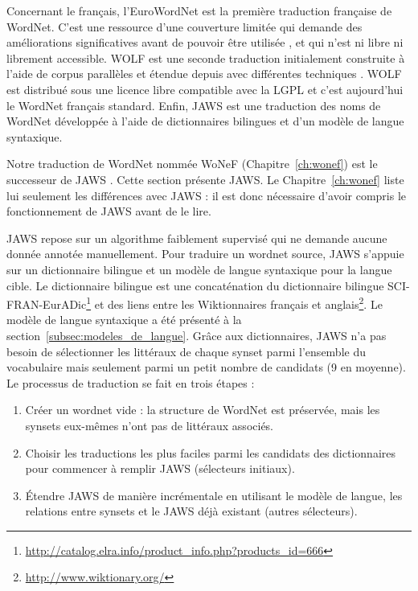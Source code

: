 Concernant le français, l'EuroWordNet \citep{vossen1998eurowordnet} est la
première traduction française de WordNet. C'est une ressource d'une couverture
limitée qui demande des améliorations significatives avant de pouvoir être
utilisée \citep{jacquin2006systemes}, et qui n'est ni libre ni librement
accessible. WOLF est une seconde traduction initialement construite à l'aide de
corpus parallèles \citep{sagot2008construction} et étendue depuis avec
différentes techniques \citep{apidianaki2012applying}. WOLF est distribué sous
une licence libre compatible avec la LGPL et c'est aujourd'hui le WordNet
français standard. Enfin, JAWS \citep{mouton2010jaws} est une traduction des
noms de WordNet développée à l'aide de dictionnaires bilingues et d'un modèle
de langue syntaxique.

\label{subsec:jaws_translation_process}

Notre traduction de WordNet nommée WoNeF (Chapitre~\ref{ch:wonef}) est le
successeur de JAWS \citep{mouton2010jaws,mouton2010phd}. Cette section présente
JAWS. Le Chapitre~\ref{ch:wonef} liste lui seulement les différences avec JAWS
: il est donc nécessaire d'avoir compris le fonctionnement de JAWS avant de le
lire.

JAWS repose sur un algorithme faiblement supervisé qui ne demande aucune donnée
annotée manuellement. Pour traduire un wordnet source, JAWS s'appuie sur un
dictionnaire bilingue et un modèle de langue syntaxique pour la langue cible.
Le dictionnaire bilingue est une concaténation du dictionnaire bilingue
SCI-FRAN-EurADic\footnote{\url{http://catalog.elra.info/product_info.php?products_id=666}}
et des liens entre les Wiktionnaires français et
anglais\footnote{\url{http://www.wiktionary.org/}}. Le modèle de langue
syntaxique a été présenté à la section~\ref{subsec:modeles_de_langue}. Grâce
aux dictionnaires, JAWS n'a pas besoin de sélectionner les littéraux de chaque
synset parmi l'ensemble du vocabulaire mais seulement parmi un petit nombre de
candidats (9 en moyenne).  Le processus de traduction se fait en trois étapes :

\begin{enumerate}
    \item Créer un wordnet vide : la structure de WordNet est préservée, mais
        les synsets eux-mêmes n'ont pas de littéraux associés.
    \item Choisir les traductions les plus faciles parmi les candidats des
        dictionnaires pour commencer à remplir JAWS (sélecteurs initiaux).
    \item Étendre JAWS de manière incrémentale en utilisant le modèle de
        langue, les relations entre synsets et le JAWS déjà existant (autres
        sélecteurs).
\end{enumerate}

